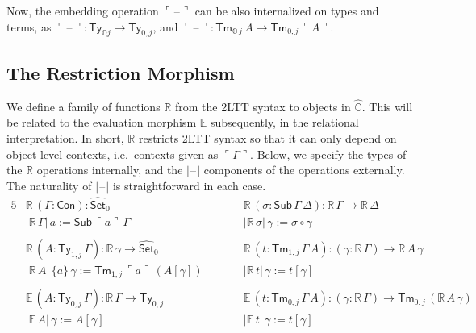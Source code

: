 \documentclass[acmsmall]{acmart}
\newcommand{\msf}[1]{\mathsf{#1}}
\newcommand{\mbb}[1]{\mathbb{#1}}
\newcommand{\wh}[1]{\widehat{#1}}
\newcommand{\mbbo}{\mbb{O}}
\newcommand{\Con}{\msf{Con}}
\newcommand{\Sub}{\msf{Sub}}
\newcommand{\Ty}{\msf{Ty}}
\newcommand{\Tm}{\msf{Tm}}
\newcommand{\Set}{\mathsf{Set}}
\newcommand{\blank}{{\mathord{\hspace{1pt}\text{--}\hspace{1pt}}}}
\newcommand{\emb}[1]{\ulcorner#1\urcorner}
\newcommand{\hato}{\bm\hat{\mbbo}}
\newcommand{\ev}{\mbb{E}}
\newcommand{\re}{\mbb{R}}
\theoremstyle{remark}
\newcommand{\whset}{\wh{\Set}}
\begin{document}
Now, the embedding operation $\emb{\blank}$ can be also internalized on types
and terms, as $\emb{\blank} : \Ty_{\mbbo j} \to \Ty_{0,j}$, and $\emb{\blank}
:\Tm_{\mbbo\,j}\,A \to \Tm_{0,j}\,\emb{A}$.

\subsection{The Restriction Morphism}

We define a family of functions $\re$ from the 2LTT syntax to objects in
$\hato$. This will be related to the evaluation morphism $\ev$ subsequently, in
the relational interpretation. In short, $\re$ restricts 2LTT syntax so that it
can only depend on object-level contexts, i.e.\ contexts given as
$\emb{\Gamma}$. Below, we specify the types of the $\re$ operations internally,
and the $|\blank|$ components of the operations externally. The naturality of
$|\blank|$ is straightforward in each case.
\begin{alignat*}{5}
  & \re\,(\Gamma : \Con) : \whset_0 && \re\,(\sigma : \Sub\,\Gamma\,\Delta) : \re\,\Gamma \to \re\,\Delta \\
  & |\re\,\Gamma|\,a := \Sub\,\emb{a}\,\Gamma && |\re\,\sigma|\,\gamma := \sigma \circ \gamma \\
  & \\
  & \re\,(A : \Ty_{1,j}\,\Gamma) : \re\,\gamma \to \whset_0 && \re\,(t : \Tm_{1,j}\,\Gamma\,A) : (\gamma : \re\,\Gamma) \to \re\,A\,\gamma \\
  & |\re\,A|\,\{a\}\,\gamma := \Tm_{1,j}\,\emb{a}\,(A[\gamma])\hspace{2em} && |\re\,t|\,\gamma := t[\gamma]\\
  & \\
  & \ev\,(A : \Ty_{0,j}\,\Gamma) : \re\,\Gamma \to \Ty_{0,j}\hspace{2em} && \ev\,(t : \Tm_{0,j}\,\Gamma\,A) : (\gamma : \re\,\Gamma) \to \Tm_{0,j}\,(\re\,A\,\gamma)\\
  & |\ev\,A|\,\gamma := A[\gamma] && |\ev\,t|\,\gamma := t[\gamma]
\end{alignat*}
\end{document}
